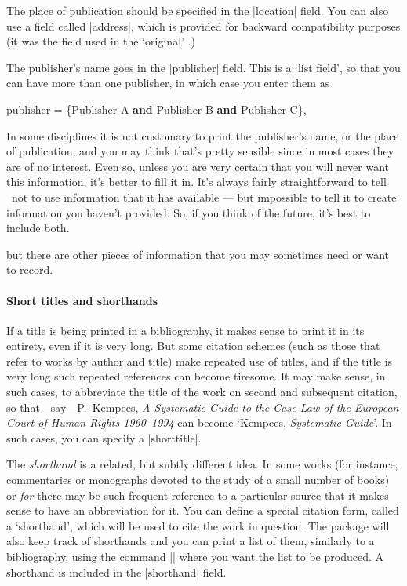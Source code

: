 The place of publication should be specified in the |location|
field. You can also use a field called |address|, which is provided
for backward compatibility purposes (it was the field used in the
`original' \bibtex.)

The publisher's name goes in the |publisher| field. This is a `list
field', so that you can have more than one publisher, in which case
you enter them as
\begin{center}
\ttfamily
publisher = \{Publisher A \textbf{and} Publisher B \textbf{and} Publisher C\},
\end{center}

In some disciplines it is not customary to print the publisher's name,
or the place of publication, and you may think that's pretty
sensible since in most cases they are of no interest. Even so, unless
you are very certain that you will never want this information, it's
better to fill it in. It's always fairly straightforward to tell
\biblatex\ not to use information that it has available --- but
impossible to tell it to create information you haven't provided. So,
if you think of the future, it's best to include both.

 but there are other pieces of information
that you may sometimes need or want to record.

\paragraph{Short titles and shorthands} If a title is being printed in
a bibliography, it makes sense to print it in its entirety, even if it
is very long. But some citation schemes (such as those that refer to
works by author and title) make repeated use of titles, and if the
title is very long such repeated references can become tiresome. It
may make sense, in such cases, to abbreviate the title of the work on
second and subsequent citation, so that---say---P.\ Kempees, \emph{A
  Systematic Guide to the Case-Law of the European Court of Human
  Rights 1960--1994} can become `Kempees, \emph{Systematic Guide}'. In
such cases, you can specify a |shorttitle|.

The \emph{shorthand} is a related, but subtly different idea. In some
works (for instance, commentaries or monographs devoted to the study
of a small number of books) or \emph{for} there may be such frequent
reference to a particular source that it makes sense to have an
abbreviation for it. You can define a special citation form, called a
`shorthand', which will be used to cite the work in question. The
package will also keep track of shorthands and you can print a list of
them, similarly to a bibliography, using the command
|\printshorthands| where you want the list to be produced. A shorthand is included in the
|shorthand| field.


